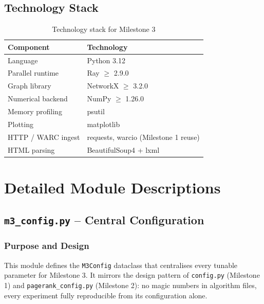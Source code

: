 \documentclass[11pt,a4paper]{article}
\begin{document}
\subsection{Technology Stack}
\begin{table}[H]
\centering
\caption{Technology stack for Milestone 3}
\label{tab:tech_stack}
\begin{tabular}{ll}
\toprule
\textbf{Component} & \textbf{Technology} \\
\midrule
Language & Python 3.12 \\
Parallel runtime & Ray $\geq$ 2.9.0 \\
Graph library & NetworkX $\geq$ 3.2.0 \\
Numerical backend & NumPy $\geq$ 1.26.0 \\
Memory profiling & psutil \\
Plotting & matplotlib \\
HTTP / WARC ingest & requests, warcio (Milestone 1 reuse) \\
HTML parsing & BeautifulSoup4 + lxml \\
\bottomrule
\end{tabular}
\end{table}

\section{Detailed Module Descriptions}

\subsection{\texttt{m3\_config.py} -- Central Configuration}

\subsubsection{Purpose and Design}
This module defines the \texttt{M3Config} dataclass that centralises every
tunable parameter for Milestone 3. It mirrors the design pattern of
\texttt{config.py} (Milestone 1) and \texttt{pagerank\_config.py}
(Milestone 2): no magic numbers in algorithm files, every experiment
fully reproducible from its configuration alone.
\end{document}
